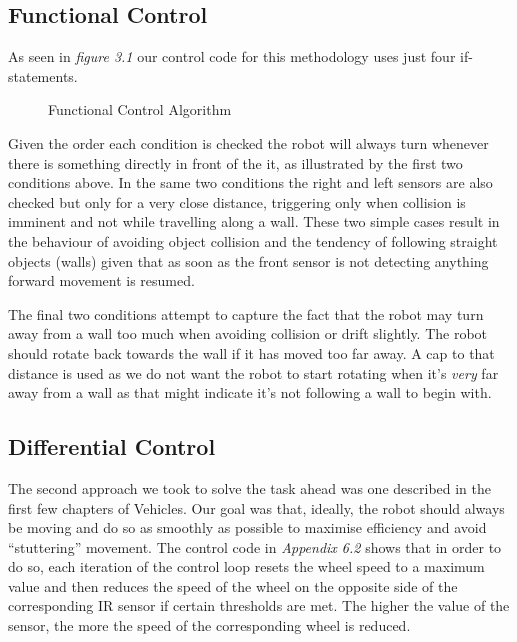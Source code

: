 \documentclass[paper=a4, fontsize=12pt]{scrartcl}	%
\numberwithin{equation}{section}		%
\numberwithin{figure}{section}			%
\numberwithin{table}{section}				%
\begin{document}
\subsection{Functional Control}
As seen in \emph{figure 3.1} our control code for this methodology uses just
four if-statements.

\begin{figure}[!ht]
\begin{framed}
\begin{algorithmic}
 \ENDIF
 \ENDIF
 \ENDIF
 \ENDIF
\end{algorithmic}
\end{framed}
\caption{Functional Control Algorithm}
\end{figure}

Given the order each condition is checked the robot will always turn whenever
there is something directly in front of the it, as illustrated by the first two
conditions above. In the same two conditions the right and left sensors are also
checked but only for a very close distance, triggering only when collision is
imminent and not while travelling along a wall. These two simple cases result in
the behaviour of avoiding object collision and the tendency of following
straight objects (walls) given that as soon as the front sensor is not detecting
anything forward movement is resumed.

The final two conditions attempt to capture the fact that the robot may turn
away from a wall too much when avoiding collision or drift slightly. The robot
should rotate back towards the wall if it has moved too far away. A cap to that
distance is used as we do not want the robot to start rotating when it's
\emph{very} far away from a wall as that might indicate it's not following a
wall to begin with.
\subsection{Differential Control}
The second approach we took to solve the task ahead was one described in the
first few chapters of Vehicles\cite{vehicles}. Our goal was that, ideally, the
robot should always be moving and do so as smoothly as possible to maximise
efficiency and avoid ``stuttering'' movement. The control code in \emph{Appendix
6.2} shows that in order to do so, each iteration of the control loop resets the
wheel speed to a maximum value and then reduces the speed of the wheel on the
opposite side of the corresponding IR sensor if certain thresholds are met. The
higher the value of the sensor, the more the speed of the corresponding wheel is
reduced.
\end{document}
